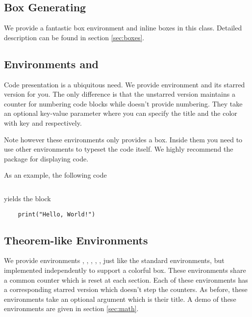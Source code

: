 \documentclass[showbib, lang=zh]{DeanReport}
\begin{document}
\subsection{Box Generating}
We provide a fantastic box environment and inline boxes in this class. Detailed description can be found in section \ref{sec:boxes}.

\subsection{Environments  and }
Code presentation is a ubiquitous need. We provide environment  and its starred version  for you. The only difference is that the unstarred version maintains a counter for numbering code blocks while  doesn't provide numbering.
They take an optional key-value parameter where you can specify the title and the color with key  and  respectively.
\par 
Note however these environments only provides a box. Inside them you need to use other environments to typeset the code itself. We highly recommend the  package for displaying code.
\par 
As an example, the following code 
\begin{codeblock*}
\inputminted[autogobble]{latex}{examplecode}
\end{codeblock*}
yields the block
\begin{codeblock}[title = Hello World in Python, color = pink]
\begin{verbatim}
    print("Hello, World!")
\end{verbatim}
\end{codeblock}

\subsection{Theorem-like Environments}
We provide environments , , , , ,  just like the standard  environments, but implemented independently to support a colorful box. These environments share a common counter which is reset at each section. Each of these environments has a corresponding starred version which doesn't step the counters. As before, these environments take an optional argument which is their title. A demo of these environments are given in section \ref{sec:math}.
\end{document}
